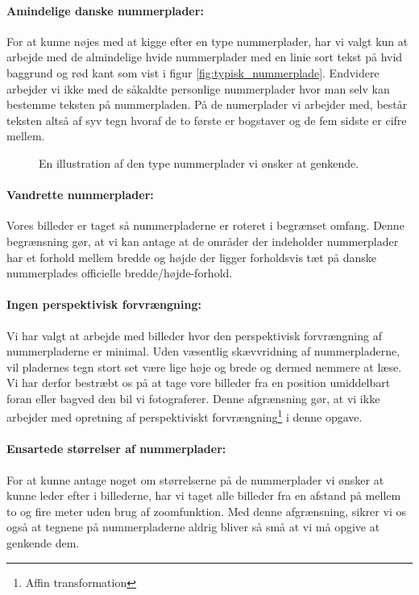 \paragraph{Amindelige danske nummerplader:}
For at kunne nøjes med at kigge efter en type nummerplader, har vi valgt kun at arbejde med de almindelige hvide nummerplader med en linie sort tekst på hvid baggrund og rød kant som vist i figur \vref{fig:typisk_nummerplade}. Endvidere arbejder vi ikke med de såkaldte personlige nummerplader hvor man selv kan bestemme teksten på nummerpladen. På de numerplader vi arbejder med, består teksten altså af syv tegn hvoraf de to første er bogstaver og de fem sidste er cifre mellem.

\begin{figure}[htp]
\centering
{} 
\caption{En illustration af den type nummerplader vi ønsker at genkende.}
\label{fig:typisk_nummerplade}
\end{figure}

\paragraph{Vandrette nummerplader:}
Vores billeder er taget så nummerpladerne er roteret i begrænset omfang. Denne begrænsning gør, at vi kan antage at de områder der indeholder nummerplader har et forhold mellem bredde og højde der ligger forholdsvis tæt på danske nummerplades officielle bredde/højde-forhold.

\paragraph{Ingen perspektivisk forvrængning:}
Vi har valgt at arbejde med billeder hvor den perspektivisk forvrængning af nummerpladerne er minimal. Uden væsentlig skævvridning af nummerpladerne, vil pladernes tegn stort set være lige høje og brede og dermed nemmere at læse. Vi har derfor bestræbt os på at tage vore billeder fra en position umiddelbart foran eller bagved den bil vi fotograferer. Denne afgrænsning gør, at vi ikke arbejder med opretning af perspektiviskt forvrængning\footnote{Affin transformation} i denne opgave. 

\paragraph{Ensartede størrelser af nummerplader:}
For at kunne antage noget om størrelserne på de nummerplader vi ønsker at kunne leder efter i billederne, har vi taget alle billeder fra en afstand på mellem to og fire meter uden brug af zoomfunktion. Med denne afgrænsning, sikrer vi os også at tegnene på nummerpladerne aldrig bliver så små at vi må opgive at genkende dem.

